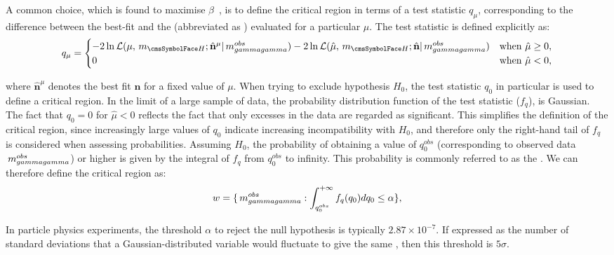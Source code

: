 A common choice, which is found to maximise $\beta$~\cite{Cowan}, is to define the critical region in terms of a test statistic $q_{\mu}$, corresponding to the difference between the best-fit \NLL and the \NLL (abbreviated as \DNLL) evaluated for a particular $\mu$. The test statistic is defined explicitly as:
\begin{equation}
\label{eq:statandresults:test_statistic}
q_{\mu} = \begin{cases} 
 -2 \ln \mathcal{L}(\mu,\mH; \hat{\mathbf{n}}^{\mu}| \mgg^{obs})- 2\ln\mathcal{L}(\hat{\mu},\mH;\hat{\mathbf{n}}| \mgg^{obs} ) & \text{when } \hat{\mu} \geq 0, \\
 0 & \text{when } \hat{\mu} < 0, 
 \end{cases}
\end{equation}

where $\hat{\mathbf{n}}^{\mu}$ denotes the best fit $\mathbf{n}$ for a fixed value of $\mu$. 
When trying to exclude hypothesis $H_{0}$, the test statistic $q_{0}$ in particular is used to define a critical region. In the limit of a large sample of data, the probability distribution function of the test statistic ($f_q$), is Gaussian. The fact that $q_{0} =0$ for $\hat{\mu} < 0$ reflects the fact that only excesses in the data are regarded as significant. This simplifies the definition of the critical region, since increasingly large values of $q_{0}$ indicate increasing incompatibility with $H_{0}$, and therefore only the right-hand tail of $f_q$ is considered when assessing probabilities. Assuming $H_{0}$, the probability of obtaining a value of $q^{{obs}}_{0}$ (corresponding to observed data $ \,m_{gammagamma}^{obs}$) or higher is given by the integral of $f_q$ from $q^{{obs}}_{0}$ to infinity. This probability is commonly referred to as the \pvalue. We can therefore define the critical region as: 
\begin{equation}
w = \{ \,m_{gammagamma}^{obs} : \int_{q^{{obs}}_{0}}^{+\infty} f_q(q_{0}) dq_0 \leq \alpha \},
\end{equation}

In particle physics experiments, the threshold $\alpha$ to reject the null hypothesis is typically $2.87 \times 10^{-7}$. If expressed as the number of standard deviations that a Gaussian-distributed variable would fluctuate to give the same \pvalue, then this threshold is $5\sigma$.

